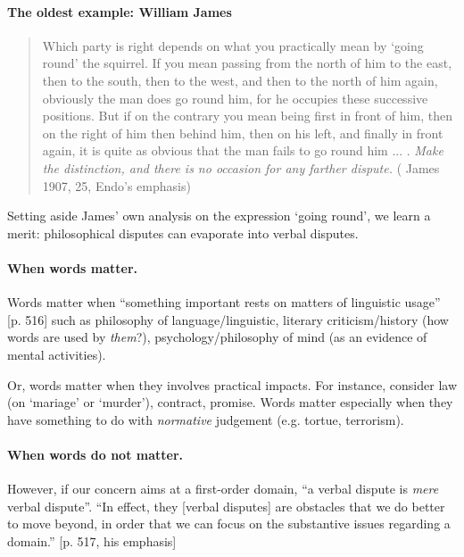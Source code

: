 \documentclass[
10pt, %
a4paper, %
twocolumn, %
landscape %
]{article}
\begin{document}
\paragraph{The oldest example: William James}

  \begin{quote}
    Which party is right depends on what you practically mean by `going round' the squirrel. If you mean passing from the north of him to the east, then to the south, then to the west, and then to the north of him again, obviously the man does go round him, for he occupies these successive positions. But if on the contrary you mean being first in front of him, then on the right of him then behind him, then on his left, and finally in front again, it is quite as obvious that the man fails to go round him ... . \emph{Make the distinction, and there is no occasion for any farther dispute.} ( James 1907, 25, Endo's emphasis)
  \end{quote}

Setting aside James' own analysis on the expression `going round', we learn a merit: philosophical disputes can evaporate into verbal disputes.

\paragraph{When words matter.}
Words matter when ``something important rests on matters of linguistic usage'' [p. 516] such as philosophy of language/linguistic, literary criticism/history (how words are used by \emph{them}?), psychology/philosophy of mind (as an evidence of mental activities).

Or, words matter when they involves practical impacts. For instance, consider law (on `mariage' or `murder'), contract, promise.
Words matter especially when they have something to do with \emph{normative} judgement (e.g. tortue, terrorism).

\paragraph{When words do not matter.}
However, if our concern aims at a first-order domain, ``a verbal dispute is \emph{mere} verbal dispute''.
``In effect, they [verbal disputes] are obstacles that we do better to move beyond, in order that we can focus on the substantive issues regarding a domain.'' [p. 517, his emphasis]
\end{document}
